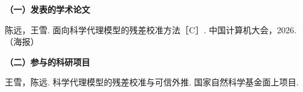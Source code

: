 \begin{publication}
 \noindent\songti\textbf{（一）发表的学术论文}
 \begin{publist}
 \item 陈远，王雪. 面向科学代理模型的残差校准方法［C］. 中国计算机大会，2026.（海报）
 \end{publist}

 \noindent\songti\textbf{（二）参与的科研项目}
 \begin{publist}
 \item 王雪，陈远. 科学代理模型的残差校准与可信外推. 国家自然科学基金面上项目.
 \end{publist}
\end{publication}

